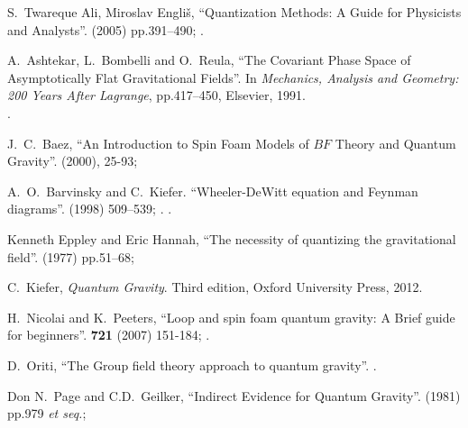 \begin{thebibliography}{99}
S.~Twareque Ali, Miroslav Engli\v{s},
``Quantization Methods: A Guide for Physicists and Analysts''.
  (2005) pp.391--490;
.\\
{\tt{}}

A.~Ashtekar, L.~Bombelli and O.~Reula,
``The Covariant Phase Space of Asymptotically Flat Gravitational Fields''.
In \textit{Mechanics, Analysis and Geometry: 200 Years After Lagrange},
pp.417--450, Elsevier, 1991. \\
{\tt{}}.

J.~C.~Baez,
``An Introduction to Spin Foam Models of $BF$ Theory and Quantum Gravity''.
  (2000), 25-93;
\\
{\tt{}}

A.~O.~Barvinsky and C.~Kiefer.
``Wheeler-DeWitt equation and Feynman diagrams''.
  (1998) 509--539; .\newline
{\tt{}}.

 Kenneth Eppley and Eric Hannah,
``The necessity of quantizing the gravitational field''.
  (1977) pp.51--68;
{\tt{}}

C.~Kiefer,
\textit{Quantum Gravity}.
Third edition, Oxford University Press, 2012.

H.~Nicolai and K.~Peeters,
``Loop and spin foam quantum gravity: A Brief guide for beginners''.
 \textbf{721} (2007) 151-184;
.\\
{\tt{}}


D.~Oriti,
``The Group field theory approach to quantum gravity''.
.

 Don N.~Page and C.D.~Geilker,
``Indirect Evidence for Quantum Gravity''.
  (1981) pp.979 \emph{et seq.};
{\tt{}}


\end{thebibliography}
